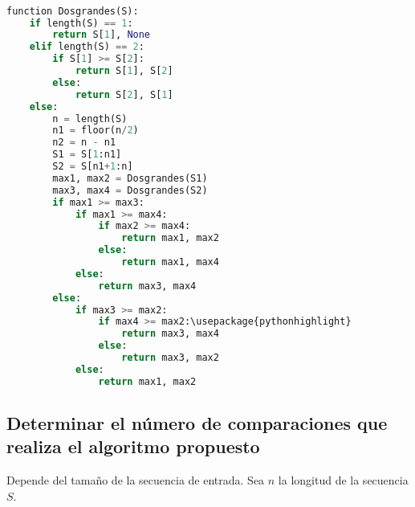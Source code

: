 \begin{lstlisting}[language=python]

function Dosgrandes(S):
    if length(S) == 1:
        return S[1], None
    elif length(S) == 2:
        if S[1] >= S[2]:
            return S[1], S[2]
        else:
            return S[2], S[1]
    else:
        n = length(S)
        n1 = floor(n/2)
        n2 = n - n1
        S1 = S[1:n1]
        S2 = S[n1+1:n]
        max1, max2 = Dosgrandes(S1)
        max3, max4 = Dosgrandes(S2)
        if max1 >= max3:
            if max1 >= max4:
                if max2 >= max4:
                    return max1, max2
                else:
                    return max1, max4
            else:
                return max3, max4
        else:
            if max3 >= max2:
                if max4 >= max2:\usepackage{pythonhighlight}
                    return max3, max4
                else:
                    return max3, max2
            else:
                return max1, max2
\end{lstlisting}


\subsection{Determinar el número de comparaciones que realiza el algoritmo propuesto}

Depende del tamaño de la secuencia de entrada. Sea $n$ la longitud de la secuencia $S$.

